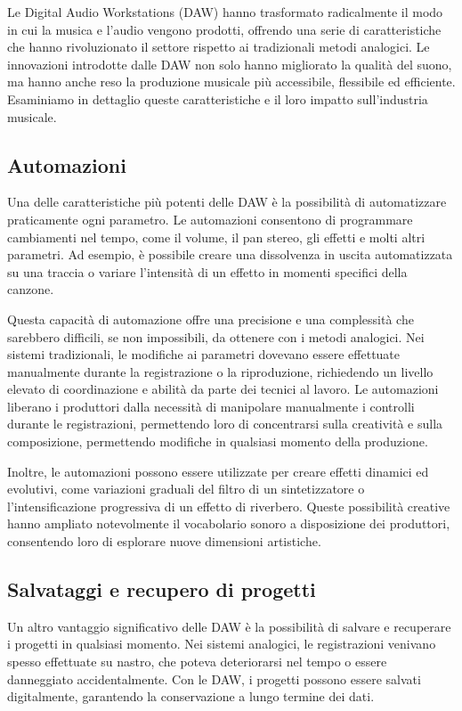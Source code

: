 \documentclass{book}
\begin{document}
Le Digital Audio Workstations (DAW) hanno trasformato radicalmente il modo in cui la musica e l’audio vengono prodotti, offrendo una serie di caratteristiche che hanno rivoluzionato il settore rispetto ai tradizionali metodi analogici. Le innovazioni introdotte dalle DAW non solo hanno migliorato la qualità del suono, ma hanno anche reso la produzione musicale più accessibile, flessibile ed efficiente. Esaminiamo in dettaglio queste caratteristiche e il loro impatto sull’industria musicale.

\subsection{Automazioni}

Una delle caratteristiche più potenti delle DAW è la possibilità di automatizzare praticamente ogni parametro. Le automazioni consentono di programmare cambiamenti nel tempo, come il volume, il pan stereo, gli effetti e molti altri parametri. Ad esempio, è possibile creare una dissolvenza in uscita automatizzata su una traccia o variare l’intensità di un effetto in momenti specifici della canzone.

Questa capacità di automazione offre una precisione e una complessità che sarebbero difficili, se non impossibili, da ottenere con i metodi analogici. Nei sistemi tradizionali, le modifiche ai parametri dovevano essere effettuate manualmente durante la registrazione o la riproduzione, richiedendo un livello elevato di coordinazione e abilità da parte dei tecnici al lavoro. Le automazioni liberano i produttori dalla necessità di manipolare manualmente i controlli durante le registrazioni, permettendo loro di concentrarsi sulla creatività e sulla composizione, permettendo modifiche in qualsiasi momento della produzione.

Inoltre, le automazioni possono essere utilizzate per creare effetti dinamici ed evolutivi, come variazioni graduali del filtro di un sintetizzatore o l’intensificazione progressiva di un effetto di riverbero. Queste possibilità creative hanno ampliato notevolmente il vocabolario sonoro a disposizione dei produttori, consentendo loro di esplorare nuove dimensioni artistiche.

\subsection{Salvataggi e recupero di progetti}

Un altro vantaggio significativo delle DAW è la possibilità di salvare e recuperare i progetti in qualsiasi momento. Nei sistemi analogici, le registrazioni venivano spesso effettuate su nastro, che poteva deteriorarsi nel tempo o essere danneggiato accidentalmente. Con le DAW, i progetti possono essere salvati digitalmente, garantendo la conservazione a lungo termine dei dati.
\end{document}
